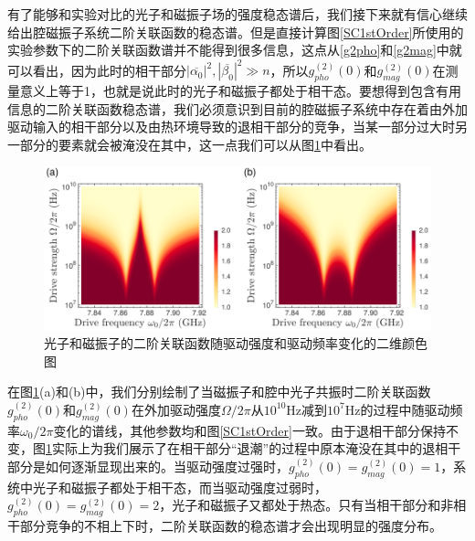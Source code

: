 有了能够和实验对比的光子和磁振子场的强度稳态谱后，我们接下来就有信心继续给出腔磁振子系统二阶关联函数的稳态谱。但是直接计算图\ref{SC1stOrder}所使用的实验参数下的二阶关联函数谱并不能得到很多信息，这点从\eqref{g2pho}和\eqref{g2mag}中就可以看出，因为此时的相干部分$|\overline{\alpha_{0}}|^{2},|\overline{\beta_{0}}|^{2} \gg n$，所以$g_{pho}^{(2)}(0)$和$g_{mag}^{(2)}(0)$在测量意义上等于1，也就是说此时的光子和磁振子都处于相干态。要想得到包含有用信息的二阶关联函数稳态谱，我们必须意识到目前的腔磁振子系统中存在着由外加驱动输入的相干部分以及由热环境导致的退相干部分的竞争，当某一部分过大时另一部分的要素就会被淹没在其中，这一点我们可以从图\ref{CoherentVary2edOrder}中看出。
\begin{figure}[htbp]
	\centering
	\includegraphics[width=2\basefigurewidth,clip]{./figure/4_2}
	\caption{光子和磁振子的二阶关联函数随驱动强度和驱动频率变化的二维颜色图} 
	\label{CoherentVary2edOrder}
\end{figure}
在图\ref{CoherentVary2edOrder}(a)和(b)中，我们分别绘制了当磁振子和腔中光子共振时二阶关联函数$g_{pho}^{(2)}(0)$和$g_{mag}^{(2)}(0)$在外加驱动强度$\Omega/2\pi$从$10^{10}$Hz减到$10^{7}$Hz的过程中随驱动频率$\omega_0/2\pi$变化的谱线，其他参数均和图\ref{SC1stOrder}一致。由于退相干部分保持不变，图\ref{CoherentVary2edOrder}实际上为我们展示了在相干部分“退潮”的过程中原本淹没在其中的退相干部分是如何逐渐显现出来的。当驱动强度过强时，$g_{pho}^{(2)}(0)=g_{mag}^{(2)}(0)=1$，系统中光子和磁振子都处于相干态，而当驱动强度过弱时，$g_{pho}^{(2)}(0)=g_{mag}^{(2)}(0)=2$，光子和磁振子又都处于热态。只有当相干部分和非相干部分竞争的不相上下时，二阶关联函数的稳态谱才会出现明显的强度分布。

